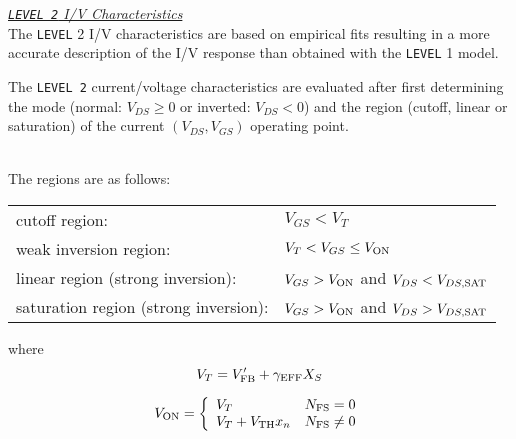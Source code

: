 \newpage
\noindent\underline{\sl {\tt LEVEL 2} I/V Characteristics}
\\[0.1in]
The {\tt LEVEL} 2 I/V characteristics are based on empirical fits resulting in a
more accurate description of the I/V response than obtained with the {\tt LEVEL}
1 model.
{
The {\tt LEVEL 2} current/voltage characteristics are evaluated after first
determining the mode (normal: $V_{DS} \ge 0$ or inverted:
$V_{DS} < 0$) and the region (cutoff,
linear or saturation) of the current
$(V_{DS}, V_{GS})$ operating point.

\\[0.2in]
The regions are as follows:\\[0.1in]

\begin{tabular}{ll}
cutoff region:&$V_{GS}<V_{T}$\\
weak inversion region:&$V_T < V_{GS} \le V_{\mbox{\scriptsize ON}}$ \\
linear region (strong inversion):&$V_{GS} > V_{\mbox{\scriptsize ON}}$
				  and $V_{DS} < V_{DS,\mbox{\scriptsize SAT}}$ \\
saturation region (strong inversion):&$V_{GS} > V_{\mbox{\scriptsize ON}}$
				  and $V_{DS} > V_{DS,\mbox{\scriptsize SAT}}$
\end{tabular}

\noindent
where
\begin{equation}
V_T = V'_{\mbox{\scriptsize FB}} + \gamma_{\mbox{\scriptsize EFF}}X_S
\end{equation}

\begin{equation}
V_{\ms{ON}} = \left\{ \begin{array}{ll}
	 V_T             & \NFS = 0\\
	 V_T + V_{\ms{TH}}x_n & \NFS \ne 0
	 \end{array} \right. %
\end{equation}

}
